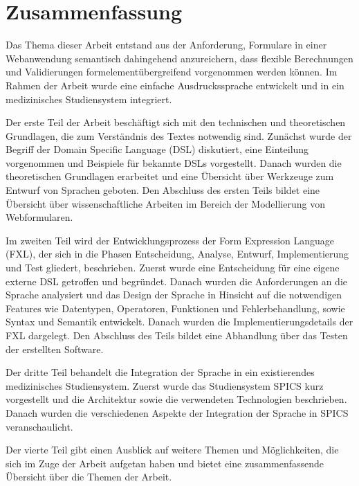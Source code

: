 \chapter{Zusammenfassung}
\label{chapter_zusammenfassung}

Das Thema dieser Arbeit entstand aus der Anforderung, Formulare in einer Webanwendung semantisch dahingehend anzureichern, dass flexible Berechnungen und Validierungen formelementübergreifend vorgenommen werden können. Im Rahmen der Arbeit wurde eine einfache Ausdruckssprache entwickelt und in ein medizinisches Studiensystem integriert.

Der erste Teil der Arbeit beschäftigt sich mit den technischen und theoretischen Grundlagen, die zum Verständnis des Textes notwendig sind. Zunächst wurde der Begriff der Domain Specific Language (DSL) diskutiert, eine Einteilung vorgenommen und Beispiele für bekannte DSLs vorgestellt. Danach wurden die theoretischen Grundlagen erarbeitet und eine Übersicht über Werkzeuge zum Entwurf von Sprachen geboten. Den Abschluss des ersten Teils bildet eine Übersicht über wissenschaftliche Arbeiten im Bereich der Modellierung von Webformularen.

Im zweiten Teil wird der Entwicklungsprozess der Form Expression Language (FXL), der sich in die Phasen Entscheidung, Analyse, Entwurf, Implementierung und Test gliedert, beschrieben. Zuerst wurde eine Entscheidung für eine eigene externe DSL getroffen und begründet. Danach wurden die Anforderungen an die Sprache analysiert und das Design der Sprache in Hinsicht auf die notwendigen Features wie Datentypen, Operatoren, Funktionen und Fehlerbehandlung, sowie Syntax und Semantik entwickelt. Danach wurden die Implementierungsdetails der FXL dargelegt. Den Abschluss des Teils bildet eine Abhandlung über das Testen der erstellten Software.

Der dritte Teil behandelt die Integration der Sprache in ein existierendes medizinisches Studiensystem. Zuerst wurde das Studiensystem SPICS kurz vorgestellt und die Architektur sowie die verwendeten Technologien beschrieben. Danach wurden die verschiedenen Aspekte der Integration der Sprache in SPICS veranschaulicht.

Der vierte Teil gibt einen Ausblick auf weitere Themen und Möglichkeiten, die sich im Zuge der Arbeit aufgetan haben und bietet eine zusammenfassende Übersicht über die Themen der Arbeit.


